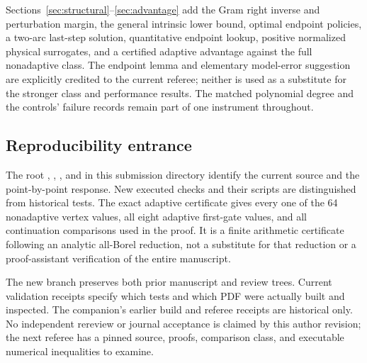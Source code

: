 Sections~\ref{sec:structural}--\ref{sec:advantage} add the Gram right inverse
and perturbation margin, the general intrinsic lower bound, optimal endpoint
policies, a two-arc last-step solution, quantitative endpoint lookup,
positive normalized physical surrogates, and a certified adaptive advantage
against the full nonadaptive class. The endpoint lemma and elementary
model-error suggestion are explicitly credited to the current referee;
neither is used as a substitute for the stronger class and performance
results. The matched polynomial degree and the controls' failure records
remain part of one instrument throughout.

\subsection{Reproducibility entrance}
The root , ,
, and  in this
submission directory identify the current source and the point-by-point
response. New executed checks and their scripts are distinguished from
historical tests. The exact adaptive certificate gives every one of the
64 nonadaptive vertex values, all eight adaptive first-gate values, and
all continuation comparisons used in the proof. It is a finite arithmetic
certificate following an analytic all-Borel reduction, not a substitute for
that reduction or a proof-assistant verification of the entire manuscript.

The new branch preserves both prior manuscript and review trees. Current
validation receipts specify which tests and which PDF were actually built
and inspected. The companion's earlier build and referee receipts are
historical only. No independent rereview or journal acceptance is claimed
by this author revision; the next referee has a pinned source, proofs,
comparison class, and executable numerical inequalities to examine.
